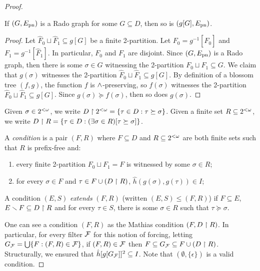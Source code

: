 \begin{proof}
\begin{lemma}\label{lem:weak-rado-cone-avoidance-Rado-preservation}
If $(G, E_{\mathrm{pn}})$ is a Rado graph for some $G \subseteq D$, then so is $(g[G], E_{\mathrm{pn}})$.	
\end{lemma}
\begin{proof}
Let $\hat{F}_0 \sqcup \hat{F}_1 \subseteq g[G]$ be a finite 2-partition. 
Let $F_0 = g^{-1}[\hat{F}_0]$ and $F_1 = g^{-1}[\hat{F}_1]$. In particular, $F_0$ and $F_1$ are disjoint. 
Since $(G, E_{\mathrm{pn}})$ is a Rado graph, then there is some $\sigma \in G$ witnessing the 2-partition $F_0 \sqcup F_1 \subseteq G$. We claim that $g(\sigma)$ witnesses the 2-partition $\hat{F}_0 \sqcup \hat{F}_1 \subseteq g[G]$. By definition of a blossom tree $(f,g)$, the function $f$ is $\wedge$-preserving, so $f(\sigma)$ witnesses the 2-partition $\hat{F}_0 \sqcup \hat{F}_1 \subseteq g[G]$. Since $g(\sigma) \succeq f(\sigma)$, then so does $g(\sigma)$.
\end{proof}


Given $\sigma \in {2^{<\omega}}$, we write $D \upharpoonright {2^{<\omega}} = \{ \tau \in D: \tau \succeq \sigma \}$.
Given a finite set $R \subseteq {2^{<\omega}}$, we write $D \upharpoonright R = \{ \tau \in D: (\exists \sigma \in R)[\tau \succeq \sigma] \}$.

\begin{definition}
A \emph{condition} is a pair $(F, R)$ where $F \subseteq D$ and $R \subseteq {2^{<\omega}}$
are both finite sets such that $R$ is prefix-free and:
\begin{enumerate}[(1)]
	\item every finite 2-partition $F_0 \sqcup F_1 = F$ is witnessed by some $\sigma \in R$;
	\item for every $\sigma \in F$ and $\tau \in F \cup (D \upharpoonright R)$, $\hat{h}(g(\sigma), g(\tau)) \in I$;
\end{enumerate}
A condition $(E, S)$ \emph{extends} $(F, R)$ (written $(E, S) \leq (F, R)$) if $F \subseteq E$, $E \smallsetminus F \subseteq D \upharpoonright R$ and for every $\tau \in S$, there is some $\sigma \in R$ such that $\tau \succeq \sigma$.
\end{definition}

One can see a condition $(F, R)$ as the Mathias condition $(F, D \upharpoonright R)$.
In particular, for every filter $\mathcal{F}$ for this notion of forcing, letting $G_{\mathcal{F}} = \bigcup \{ F: (F, R) \in \mathcal{F} \}$, if $(F, R) \in \mathcal{F}$ then $F \subseteq G_{\mathcal{F}} \subseteq F \cup (D \upharpoonright R)$.
Structurally, we ensured that $\hat{h}[g[G_{\mathcal{F}}]]^2 \subseteq I$. Note that $(\emptyset, \{\epsilon\})$ is a valid condition.


\end{proof}
